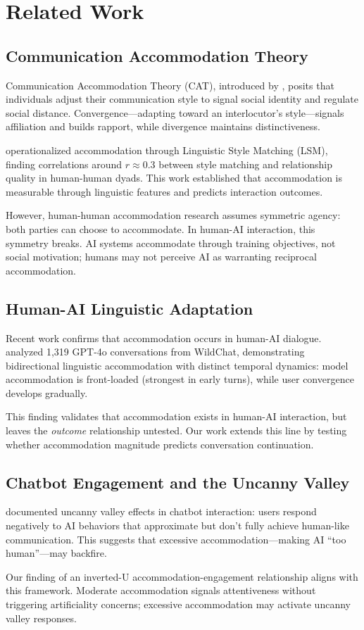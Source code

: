 \section{Related Work}

\subsection{Communication Accommodation Theory}

Communication Accommodation Theory (CAT), introduced by \citet{giles1973accommodation}, posits that individuals adjust their communication style to signal social identity and regulate social distance. Convergence---adapting toward an interlocutor's style---signals affiliation and builds rapport, while divergence maintains distinctiveness.

\citet{niederhoffer2002linguistic} operationalized accommodation through Linguistic Style Matching (LSM), finding correlations around $r\approx0.3$ between style matching and relationship quality in human-human dyads. This work established that accommodation is measurable through linguistic features and predicts interaction outcomes.

However, human-human accommodation research assumes symmetric agency: both parties can choose to accommodate. In human-AI interaction, this symmetry breaks. AI systems accommodate through training objectives, not social motivation; humans may not perceive AI as warranting reciprocal accommodation.

\subsection{Human-AI Linguistic Adaptation}

Recent work confirms that accommodation occurs in human-AI dialogue. \citet{chen2026bidirectional} analyzed 1,319 GPT-4o conversations from WildChat, demonstrating bidirectional linguistic accommodation with distinct temporal dynamics: model accommodation is front-loaded (strongest in early turns), while user convergence develops gradually.

This finding validates that accommodation exists in human-AI interaction, but leaves the \emph{outcome} relationship untested. Our work extends this line by testing whether accommodation magnitude predicts conversation continuation.

\subsection{Chatbot Engagement and the Uncanny Valley}

\citet{ciechanowski2019uncanny} documented uncanny valley effects in chatbot interaction: users respond negatively to AI behaviors that approximate but don't fully achieve human-like communication. This suggests that excessive accommodation---making AI ``too human''---may backfire.

Our finding of an inverted-U accommodation-engagement relationship aligns with this framework. Moderate accommodation signals attentiveness without triggering artificiality concerns; excessive accommodation may activate uncanny valley responses.
